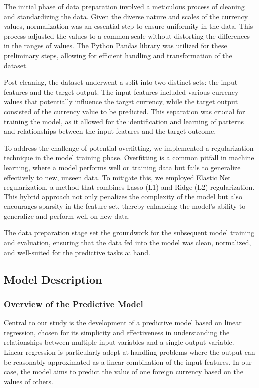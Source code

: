 \documentclass[conference]{IEEEtran}
\begin{document}
The initial phase of data preparation involved a meticulous process of cleaning and standardizing the data. Given the diverse nature and scales of the currency values, normalization was an essential step to ensure uniformity in the data. This process adjusted the values to a common scale without distorting the differences in the ranges of values. The Python Pandas library was utilized for these preliminary steps, allowing for efficient handling and transformation of the dataset.

Post-cleaning, the dataset underwent a split into two distinct sets: the input features and the target output. The input features included various currency values that potentially influence the target currency, while the target output consisted of the currency value to be predicted. This separation was crucial for training the model, as it allowed for the identification and learning of patterns and relationships between the input features and the target outcome.

To address the challenge of potential overfitting, we implemented a regularization technique in the model training phase. Overfitting is a common pitfall in machine learning, where a model performs well on training data but fails to generalize effectively to new, unseen data. To mitigate this, we employed Elastic Net regularization, a method that combines Lasso (L1) and Ridge (L2) regularization. This hybrid approach not only penalizes the complexity of the model but also encourages sparsity in the feature set, thereby enhancing the model's ability to generalize and perform well on new data.

The data preparation stage set the groundwork for the subsequent model training and evaluation, ensuring that the data fed into the model was clean, normalized, and well-suited for the predictive tasks at hand.

\subsection{Model Description}
\subsubsection{Overview of the Predictive Model}
Central to our study is the development of a predictive model based on linear regression, chosen for its simplicity and effectiveness in understanding the relationships between multiple input variables and a single output variable. Linear regression is particularly adept at handling problems where the output can be reasonably approximated as a linear combination of the input features. In our case, the model aims to predict the value of one foreign currency based on the values of others.
\end{document}
